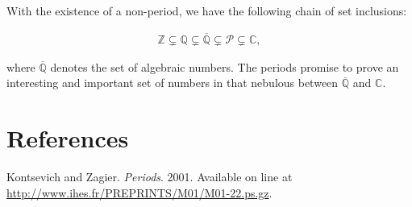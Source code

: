 \documentclass[12pt]{article}
\newcommand{\mc}{\mathcal}
\newcommand{\mb}{\mathbb}
\newcommand{\ol}{\overline}
\newcommand{\Z}{\mb{Z}}
\newcommand{\Q}{\mb{Q}}
\newcommand{\C}{\mb{C}}
\newcommand{\<}{\langle}
\renewcommand{\>}{\rangle}
\begin{document}
With the existence of a non-period, we have the following chain of set inclusions:

\begin{align*}
\Z\subsetneq \Q\subsetneq\ol{\Q}\subsetneq\mc{P}\subsetneq\C,
\end{align*}

where $\ol{\Q}$ denotes the set of algebraic numbers.  The periods promise to prove an interesting and important set of numbers in that nebulous  between $\ol{\Q}$ and $\C$.

\section{References}

Kontsevich and Zagier.  \emph{Periods}.  2001.  Available on line at \url{http://www.ihes.fr/PREPRINTS/M01/M01-22.ps.gz}.
\end{document}
